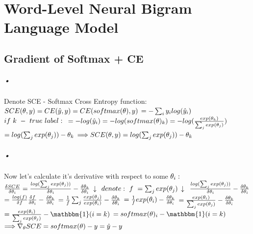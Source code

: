 \documentclass{article}
\begin{document}
\section{Word-Level Neural Bigram Language Model}
\subsection{Gradient of Softmax + CE}
\subparagraph{•}
Denote SCE - Softmax Cross Entropy function:\\
$SCE(\theta, y) = CE(\hat{y}, y) = CE(softmax(\theta), y) \\$
$= -\sum_{i} y_i log(\hat{y}_i)\\$
$if \ k \ - \ true \ label:\\$
$= - log(\hat{y}_i) = -log(softmax(\theta)_k) = -log(\frac{exp(\theta_k)}{\sum_{j}exp(\theta_j)})\\$
$= log(\sum_{j}exp(\theta_j))-\theta_k\\$
$\Longrightarrow SCE(\theta, y) = log(\sum_{j}exp(\theta_j))-\theta_k\\$

\subparagraph{•}
Now let's calculate it's derivative with respect to some $\theta_i:\\$
$\frac{\delta SCE}{\delta \theta_i} = \frac{log(\sum_{j}exp(\theta_j))}{\delta \theta_i} -\frac{\delta \theta_k}{\delta \theta_i}\\$
$\downarrow \\$
$denote: \ f \ = \sum_{j}exp(\theta_j)\\ $
$\downarrow \\$
$\frac{log(\sum_{j}exp(\theta_j))}{\delta \theta_i} -\frac{\delta \theta_k}{\delta \theta_i}\\$
$= \frac{log(f)}{\delta f}\frac{\delta f}{\delta \theta_i} -\frac{\delta \theta_k}{\delta \theta_i}\\$
$= \frac{1}{f} \sum_{j} \frac{exp(\theta_j)}{exp(\theta_i)} -\frac{\delta \theta_k}{\delta \theta_i}\\$
$= \frac{1}{f} exp(\theta_i) -\frac{\delta \theta_k}{\delta \theta_i}\\$
$= \frac{exp(\theta_i)}{\sum_{j} exp(\theta_j)}-\frac{\delta \theta_k}{\delta \theta_i}\\$
$= \frac{exp(\theta_i)}{\sum_{j} exp(\theta_j)} - \mathbbm{1}(i=k)\\$
$= softmax(\theta)_i - \mathbbm{1}(i=k)\\$
$\Longrightarrow \nabla_\theta SCE = softmax(\theta) - y = \hat{y}-y\\$ 
\end{document}
